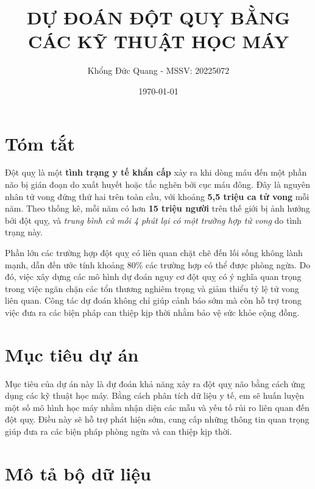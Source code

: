 \documentclass[11pt]{article}
\title{DỰ ĐOÁN ĐỘT QUỴ BẰNG CÁC KỸ THUẬT HỌC MÁY}
\author{Khổng Đức Quang - MSSV: 20225072}
\date{\today}
\begin{document}
	\maketitle
	
	\section{Tóm tắt}
	
	
	
	\hspace{0.6cm}Đột quỵ là một \textbf{tình trạng y tế khẩn cấp} xảy ra khi dòng máu đến một phần não bị gián đoạn do xuất huyết hoặc tắc nghẽn bởi cục máu đông. Đây là nguyên nhân tử vong đứng thứ hai trên toàn cầu, với khoảng \textbf{5,5 triệu ca tử vong} mỗi năm. Theo thống kê, mỗi năm có hơn \textbf{15 triệu người} trên thế giới bị ảnh hưởng bởi đột quỵ, và \textit{trung bình cứ mỗi 4 phút lại có một trường hợp tử vong} do tình trạng này.
	\vspace{0.3cm}
	
 	Phần lớn các trường hợp đột quỵ có liên quan chặt chẽ đến lối sống không lành mạnh, dẫn đến ước tính khoảng 80\% các trường hợp có thể được phòng ngừa. Do đó, việc xây dựng các mô hình dự đoán nguy cơ đột quỵ có ý nghĩa quan trọng trong việc ngăn chặn các tổn thương nghiêm trọng và giảm thiểu tỷ lệ tử vong liên quan. Công tác dự đoán không chỉ giúp cảnh báo sớm mà còn hỗ trợ trong việc đưa ra các biện pháp can thiệp kịp thời nhằm bảo vệ sức khỏe cộng đồng.
	
	\section{Mục tiêu dự án}
	
	\hspace{0.6cm}Mục tiêu của dự án này là dự đoán khả năng xảy ra đột quỵ não bằng cách ứng dụng các kỹ thuật học máy. Bằng cách phân tích dữ liệu y tế, em sẽ huấn luyện một số mô hình học máy nhằm nhận diện các mẫu và yếu tố rủi ro liên quan đến đột quỵ. Điều này sẽ hỗ trợ phát hiện sớm, cung cấp những thông tin quan trọng giúp đưa ra các biện pháp phòng ngừa và can thiệp kịp thời.
	\pagebreak
	
	\tableofcontents
	
	
	\pagebreak
	
	\listoffigures
	
	\pagebreak
	\section{Mô tả bộ dữ liệu}
	
\end{document}
